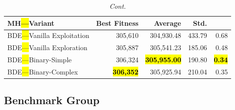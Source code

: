 \documentclass[mathematics,article,accept,moreauthors]{Definitions/mdpi}
\begin{document}
\begin{table}[H]\ContinuedFloat
\caption{\textit{Cont.}}
  \small
  \label{tab:calidad_mknapcb6_29}
  \begin{tabularx}{\textwidth}{lRRRR}
    \toprule
    \textbf{MH\hl{---}Variant} &
    \textbf{Best Fitness} &
    \textbf{Average} &
    \textbf{Std.} &
    \textbf{} \\
    \midrule



    BDE\hl{---}Vanilla Exploitation  &         305,610 &        304,930.48 & 433.79 &         0.68 \\
    BDE\hl{---}Vanilla Exploration   &         305,887 &        305,541.23 & 185.06 &         0.48 \\
    BDE\hl{---}Binary-Simple         &         306,324 & \textbf{\hl{305,955.00}} & 190.80 & \textbf{\hl{0.34}} \\
    BDE\hl{---}Binary-Complex        & \textbf{\hl{306,352}} &        305,925.94 & 210.04 &         0.35 \\
    \bottomrule
  \end{tabularx}
\end{table}

\subsection{Benchmark Group }

\vspace{-9pt}
\end{document}
